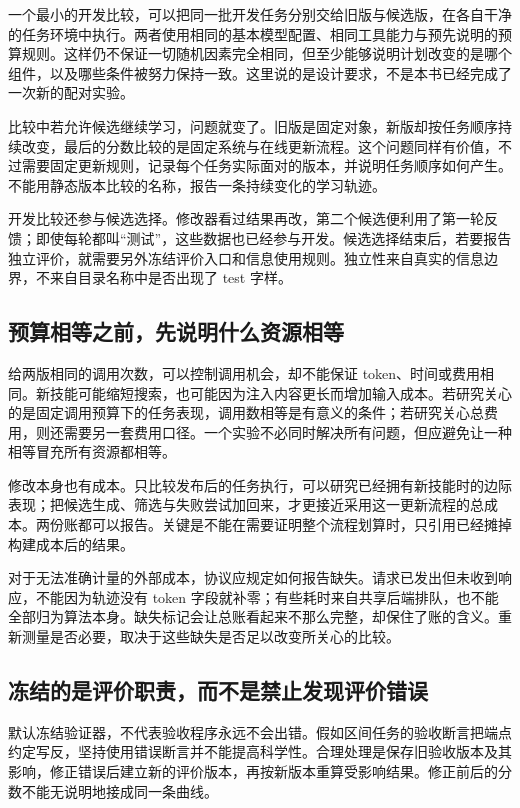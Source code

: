 一个最小的开发比较，可以把同一批开发任务分别交给旧版与候选版，在各自干净的任务环境中执行。两者使用相同的基本模型配置、相同工具能力与预先说明的预算规则。这样仍不保证一切随机因素完全相同，但至少能够说明计划改变的是哪个组件，以及哪些条件被努力保持一致。这里说的是设计要求，不是本书已经完成了一次新的配对实验。

比较中若允许候选继续学习，问题就变了。旧版是固定对象，新版却按任务顺序持续改变，最后的分数比较的是固定系统与在线更新流程。这个问题同样有价值，不过需要固定更新规则，记录每个任务实际面对的版本，并说明任务顺序如何产生。不能用静态版本比较的名称，报告一条持续变化的学习轨迹。

开发比较还参与候选选择。修改器看过结果再改，第二个候选便利用了第一轮反馈；即使每轮都叫“测试”，这些数据也已经参与开发。候选选择结束后，若要报告独立评价，就需要另外冻结评价入口和信息使用规则。独立性来自真实的信息边界，不来自目录名称中是否出现了 test 字样。

\subsection{预算相等之前，先说明什么资源相等}

给两版相同的调用次数，可以控制调用机会，却不能保证 token、时间或费用相同。新技能可能缩短搜索，也可能因为注入内容更长而增加输入成本。若研究关心的是固定调用预算下的任务表现，调用数相等是有意义的条件；若研究关心总费用，则还需要另一套费用口径。一个实验不必同时解决所有问题，但应避免让一种相等冒充所有资源都相等。

修改本身也有成本。只比较发布后的任务执行，可以研究已经拥有新技能时的边际表现；把候选生成、筛选与失败尝试加回来，才更接近采用这一更新流程的总成本。两份账都可以报告。关键是不能在需要证明整个流程划算时，只引用已经摊掉构建成本后的结果。

对于无法准确计量的外部成本，协议应规定如何报告缺失。请求已发出但未收到响应，不能因为轨迹没有 token 字段就补零；有些耗时来自共享后端排队，也不能全部归为算法本身。缺失标记会让总账看起来不那么完整，却保住了账的含义。重新测量是否必要，取决于这些缺失是否足以改变所关心的比较。

\subsection{冻结的是评价职责，而不是禁止发现评价错误}

默认冻结验证器，不代表验收程序永远不会出错。假如区间任务的验收断言把端点约定写反，坚持使用错误断言并不能提高科学性。合理处理是保存旧验收版本及其影响，修正错误后建立新的评价版本，再按新版本重算受影响结果。修正前后的分数不能无说明地接成同一条曲线。

